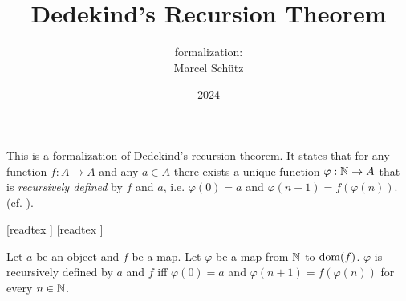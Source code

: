 \documentclass{article}
\title{Dedekind's Recursion Theorem}
\author{\Naproche formalization: \vspace{0.5em} \\
Marcel Schütz}
\date{2024}
\begin{document}
  \maketitle

  \noindent This is a formalization of Dedekind's recursion theorem.
  It states that for any function $f : A \to A$ and any $a \in A$
  there exists a unique function
  $\varphi : \mathbb{N} \to A$ that is \emph{recursively defined} by
  $f$ and $a$, i.e. $\varphi(0) = a$ and
  $\varphi(n + 1) = f(\varphi(n))$.
  (cf. \cite{Ebbinghaus1991}).

  \begin{imports}
    \begin{forthel}
      [readtex ]
      [readtex ]
    \end{forthel}
  \end{imports}

  \begin{forthel}
    \begin{definition*}
      Let $a$ be an object and $f$ be a map.
      Let $\varphi$ be a map from $\mathbb{N}$ to $\operatorname{dom}(f)$.
      $\varphi$ is recursively defined by $a$ and $f$ iff $\varphi(0) = a$ and $\varphi(n + 1) = f(\varphi(n))$ for every $n \in \mathbb{N}$.
    \end{definition*}
  \end{forthel}
\end{document}
